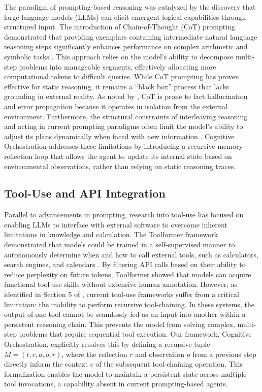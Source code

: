 \documentclass[11pt,a4paper]{article}
\begin{document}
The paradigm of prompting-based reasoning was catalyzed by the discovery that large language models (LLMs) can elicit emergent logical capabilities through structured input. The introduction of Chain-of-Thought (CoT) prompting demonstrated that providing exemplars containing intermediate natural language reasoning steps significantly enhances performance on complex arithmetic and symbolic tasks \cite{wei2022}. This approach relies on the model's ability to decompose multi-step problems into manageable segments, effectively allocating more computational tokens to difficult queries. While CoT prompting has proven effective for static reasoning, it remains a ``black box'' process that lacks grounding in external reality. As noted by \cite{yao2023}, CoT is prone to fact hallucination and error propagation because it operates in isolation from the external environment. Furthermore, the structural constraints of interleaving reasoning and acting in current prompting paradigms often limit the model's ability to adjust its plans dynamically when faced with new information \cite{yao2023}. Cognitive Orchestration addresses these limitations by introducing a recursive memory-reflection loop that allows the agent to update its internal state based on environmental observations, rather than relying on static reasoning traces.

\subsection{Tool-Use and API Integration}

Parallel to advancements in prompting, research into tool-use has focused on enabling LLMs to interface with external software to overcome inherent limitations in knowledge and calculation. The Toolformer framework demonstrated that models could be trained in a self-supervised manner to autonomously determine when and how to call external tools, such as calculators, search engines, and calendars \cite{schick2023}. By filtering API calls based on their ability to reduce perplexity on future tokens, Toolformer showed that models can acquire functional tool-use skills without extensive human annotation. However, as identified in Section 5 of \cite{schick2023}, current tool-use frameworks suffer from a critical limitation: the inability to perform recursive tool-chaining. In these systems, the output of one tool cannot be seamlessly fed as an input into another within a persistent reasoning chain. This prevents the model from solving complex, multi-step problems that require sequential tool execution. Our framework, Cognitive Orchestration, explicitly resolves this by defining a recursive tuple $M = (t, c, a, o, r)$, where the reflection $r$ and observation $o$ from a previous step directly inform the context $c$ of the subsequent tool-chaining operation. This formalization enables the model to maintain a persistent state across multiple tool invocations, a capability absent in current prompting-based agents.
\end{document}
